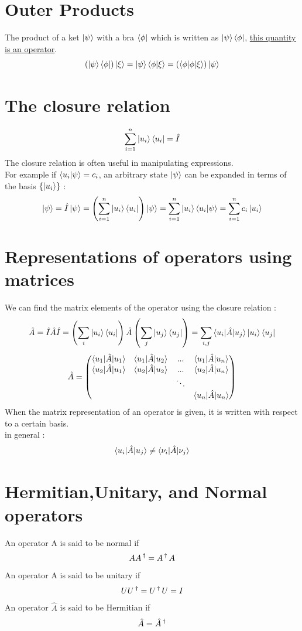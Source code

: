 \documentclass[12pt,oneside]{book}
\begin{document}
\section{Outer Products}
The product of a ket $\ket{\psi}$ with a bra $\bra{\phi}$ which is written as $\ket{\psi}\bra{\phi}$, \underline{this quantity is an operator}.
\[(\ket{\psi}\bra{\phi})\ket{\xi} = \ket{\psi}\braket{\phi|\xi} = (\braket{\phi|\phi|\xi})\ket{\psi} \]
\section{The closure relation}
\[\sum_{i=1}^n \ket{u_i}\bra{u_i} = \hat{I}\]
The closure relation is often useful in manipulating expressions.\\
For example if $\braket{u_i|\psi} = c_i$, an arbitrary state $\ket{\psi}$ can be expanded in terms of the basis $\{ \ket{u_i} \}$ :
\[\ket{\psi}  = \hat{I}\ket{\psi} = \left( \sum_{i=1}^n\ket{u_i}\bra{u_i} \right)\ket{\psi} = \sum_{i=1}^{n}\ket{u_i}\braket{u_i|\psi} = \sum_{i=1}^nc_i\ket{u_i} \]
\section{Representations of operators using matrices}
We can find the matrix elements of the operator using the closure relation :
\[\hat{A} = \hat{I}\hat{A}\hat{I} = \left( \sum_i\ket{u_i}\bra{u_i} \right) \hat{A} \left( \sum_j \ket{u_j}\bra{u_j} \right) = \sum_{i,j}\braket{u_i|\hat{A}|u_j}\ket{u_i}\bra{u_j} \]
\[ \hat{A} =  \left( \begin{matrix}
            \braket{u_1|\hat{A}|u_1} & \braket{u_1|\hat{A}|u_2} & ...    & \braket{u_1|\hat{A}|u_n} \\
            \braket{u_2|\hat{A}|u_1} & \braket{u_2|\hat{A}|u_2} & ...    & \braket{u_2|\hat{A}|u_n} \\
                                     &                          & \ddots &                          \\
                                     &                          &        & \braket{u_n|\hat{A}|u_n} \\
        \end{matrix}\right) \]
When the matrix representation of an operator is given, it is written with respect to a certain basis.\\
in general :\[ \braket{u_i|\hat{A}|u_j} \not = \braket{\nu_i|\hat{A}|\nu_j} \]
\section{Hermitian,Unitary, and Normal operators}
An operator A is said to be normal if
\[ AA\operatorname{^\dagger} = A\operatorname{^\dagger} A \]
An operator A is said to be unitary if
\[UU\operatorname{^\dagger} = U\operatorname{^\dagger} U = I\]
An operator $\hat{A}$ is said to be Hermitian if
\[ \hat{A} = \hat{A}\operatorname{^\dagger} \]
\end{document}
